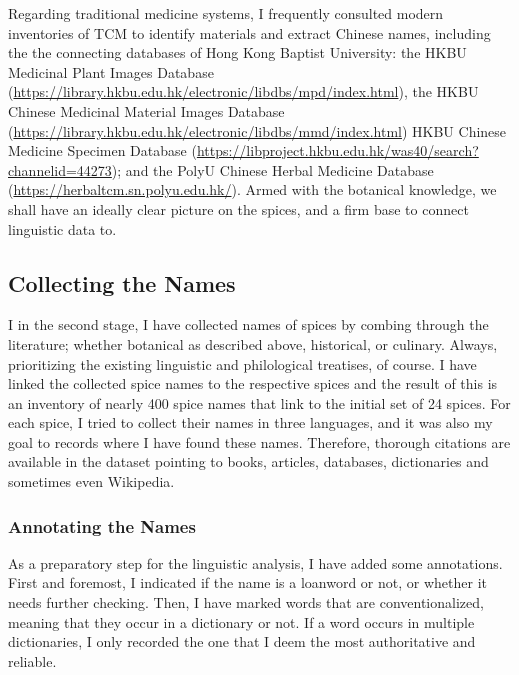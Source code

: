 Regarding traditional medicine systems, I frequently consulted modern inventories of \gls{TCM} to identify materials and extract Chinese names, including the the connecting databases of Hong Kong Baptist University: the HKBU Medicinal Plant Images Database (\url{https://library.hkbu.edu.hk/electronic/libdbs/mpd/index.html}), the HKBU Chinese Medicinal Material Images Database (\url{https://library.hkbu.edu.hk/electronic/libdbs/mmd/index.html}) HKBU Chinese Medicine Specimen Database (\url{https://libproject.hkbu.edu.hk/was40/search?channelid=44273}); and the PolyU Chinese Herbal Medicine Database (\url{https://herbaltcm.sn.polyu.edu.hk/}). Armed with the botanical knowledge, we shall have an ideally clear picture on the spices, and a firm base to connect linguistic data to.


\subsection{Collecting the Names}

I in the second stage, I have collected names of spices by combing through the literature; whether botanical as described above, historical, or culinary. Always, prioritizing the existing linguistic and philological treatises, of course. I have linked the collected spice names to the respective spices and the result of this is an inventory of nearly 400 spice names that link to the initial set of 24 spices. For each spice, I tried to collect their names in three languages, and it was also my goal to records where I have found these names. Therefore, thorough citations are available in the dataset pointing to books, articles, databases, dictionaries and sometimes even Wikipedia.

\subsubsection{Annotating the Names}

As a preparatory step for the linguistic analysis, I have added some annotations. First and foremost, I indicated if the name is a loanword or not, or whether it needs further checking. %
Then, I have marked words that are conventionalized, meaning that they occur in a dictionary or not. If a word occurs in multiple dictionaries, I only recorded the one that I deem the most authoritative and reliable. 

